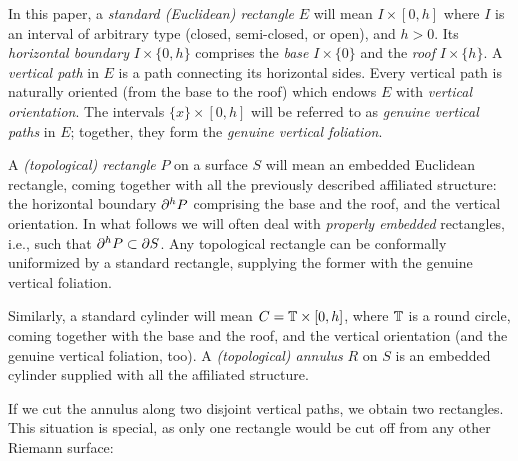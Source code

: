 In this paper, a {\it standard (Euclidean) rectangle} $E$ 
will mean $I\times [0,h]$ where $I$ is an interval of arbitrary type
(closed,  semi-closed, or open), and $h>0$. 
Its  {\it horizontal boundary}  $I\times \{0, h\}$ comprises the {\it base} $I\times \{0\}$ and
the {\it roof} $I\times \{ h\}$. 
A {\it vertical path} in $E$ is a path connecting its horizontal sides.
Every vertical path is naturally oriented (from the base to the roof) which endows $E$ with {\it vertical orientation}. 
The intervals  $\{x\}\times [0,h]$ will be referred to as {\it genuine vertical paths} in $E$;
together, they form the {\it genuine vertical foliation}. 


A {\it (topological) rectangle} $P$ on a surface $S$ will mean an embedded Euclidean rectangle,
coming together with all the previously described affiliated structure: the horizontal boundary $\partial^h P$ 
comprising the base and the roof, and the vertical orientation.
In what follows we will often deal with {\it properly embedded} rectangles, i.e., such that 
$\partial^h P\subset \partial S$. Any topological rectangle can be conformally uniformized by a standard
rectangle, supplying the former with the genuine vertical foliation. 

Similarly, a standard cylinder will mean $C={\Bbb T}\times [0,h]$, 
where ${\Bbb T}$ is a round circle, coming together with the base and the roof, and the vertical orientation
(and the genuine vertical foliation, too). 
A {\it (topological) annulus} $R$ on $S$ is an embedded cylinder supplied with all the 
affiliated structure.

If we cut the annulus along  two disjoint vertical paths, we obtain two rectangles. 
This situation is special, as only one rectangle would  be cut off from any other Riemann surface: 


